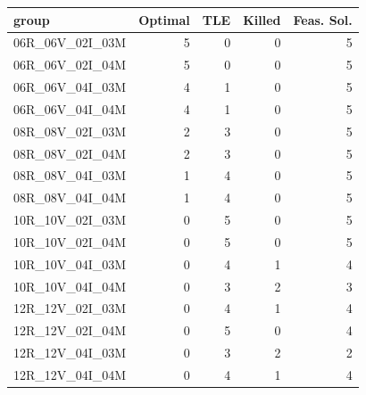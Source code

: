 
\begin{tabular}{lrrrr}
\toprule
group & Optimal & TLE & Killed & Feas. Sol.\\
\midrule
06R\_06V\_02I\_03M & 5 & 0 & 0 & 5\\
06R\_06V\_02I\_04M & 5 & 0 & 0 & 5\\
06R\_06V\_04I\_03M & 4 & 1 & 0 & 5\\
06R\_06V\_04I\_04M & 4 & 1 & 0 & 5\\
08R\_08V\_02I\_03M & 2 & 3 & 0 & 5\\
\addlinespace
08R\_08V\_02I\_04M & 2 & 3 & 0 & 5\\
08R\_08V\_04I\_03M & 1 & 4 & 0 & 5\\
08R\_08V\_04I\_04M & 1 & 4 & 0 & 5\\
10R\_10V\_02I\_03M & 0 & 5 & 0 & 5\\
10R\_10V\_02I\_04M & 0 & 5 & 0 & 5\\
\addlinespace
10R\_10V\_04I\_03M & 0 & 4 & 1 & 4\\
10R\_10V\_04I\_04M & 0 & 3 & 2 & 3\\
12R\_12V\_02I\_03M & 0 & 4 & 1 & 4\\
12R\_12V\_02I\_04M & 0 & 5 & 0 & 4\\
12R\_12V\_04I\_03M & 0 & 3 & 2 & 2\\
\addlinespace
12R\_12V\_04I\_04M & 0 & 4 & 1 & 4\\
\bottomrule
\end{tabular}
